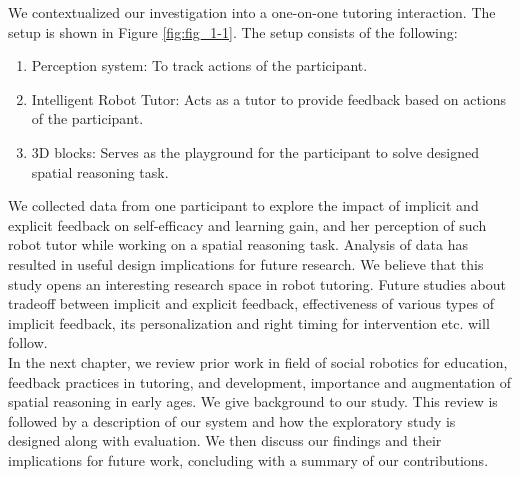 We contextualized our investigation into a one-on-one tutoring interaction. The setup is shown in Figure \ref{fig:fig_1-1}.  The setup consists of the following:
\begin{enumerate}
    \item Perception system: To track actions of the participant. 
    \item Intelligent Robot Tutor: Acts as a tutor to provide feedback based on actions of the participant.
    \item 3D blocks: Serves as the playground for the participant to solve designed spatial reasoning task. 
\end{enumerate}
We collected data from one participant to explore the impact of implicit and explicit feedback on self-efficacy and learning gain, and her perception of such robot tutor while working on a spatial reasoning task. Analysis of data has resulted in useful design implications for future research. We believe that this study opens an interesting research space in robot tutoring. Future studies about tradeoff between implicit and explicit feedback, effectiveness of various types of implicit feedback, its personalization and right timing for intervention etc. will follow.  \\
In the next chapter, we review prior work in field of social robotics for education, feedback practices in tutoring, and development, importance and augmentation of spatial reasoning in early ages. We give background to our study. This review is followed by a description of our system and how the exploratory study is designed along with evaluation. We then discuss our findings and their implications for future work, concluding with a summary of our contributions.

